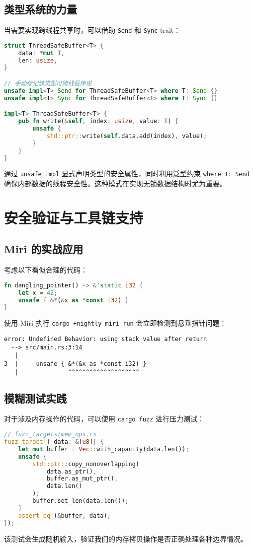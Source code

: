 \section{类型系统的力量}
当需要实现跨线程共享时，可以借助 \verb!Send! 和 \verb!Sync! trait：\par
\begin{lstlisting}[language=rust]
struct ThreadSafeBuffer<T> {
    data: *mut T,
    len: usize,
}

// 手动标记该类型可跨线程传递
unsafe impl<T> Send for ThreadSafeBuffer<T> where T: Send {}
unsafe impl<T> Sync for ThreadSafeBuffer<T> where T: Sync {}

impl<T> ThreadSafeBuffer<T> {
    pub fn write(&self, index: usize, value: T) {
        unsafe {
            std::ptr::write(self.data.add(index), value);
        }
    }
}
\end{lstlisting}
通过 \verb!unsafe impl! 显式声明类型的安全属性，同时利用泛型约束 \verb!where T: Send! 确保内部数据的线程安全性。这种模式在实现无锁数据结构时尤为重要。\par
\chapter{安全验证与工具链支持}
\section{Miri 的实战应用}
考虑以下看似合理的代码：\par
\begin{lstlisting}[language=rust]
fn dangling_pointer() -> &'static i32 {
    let x = 42;
    unsafe { &*(&x as *const i32) }
}
\end{lstlisting}
使用 Miri 执行 \verb!cargo +nightly miri run! 会立即检测到悬垂指针问题：\par
\begin{lstlisting}
error: Undefined Behavior: using stack value after return
  --> src/main.rs:3:14
   |
3  |     unsafe { &*(&x as *const i32) }
   |              ^^^^^^^^^^^^^^^^^^^^
\end{lstlisting}
\section{模糊测试实践}
对于涉及内存操作的代码，可以使用 \verb!cargo fuzz! 进行压力测试：\par
\begin{lstlisting}[language=rust]
// fuzz_targets/mem_ops.rs
fuzz_target!(|data: &[u8]| {
    let mut buffer = Vec::with_capacity(data.len());
    unsafe {
        std::ptr::copy_nonoverlapping(
            data.as_ptr(),
            buffer.as_mut_ptr(),
            data.len()
        );
        buffer.set_len(data.len());
    }
    assert_eq!(&buffer, data);
});
\end{lstlisting}
该测试会生成随机输入，验证我们的内存拷贝操作是否正确处理各种边界情况。\par
